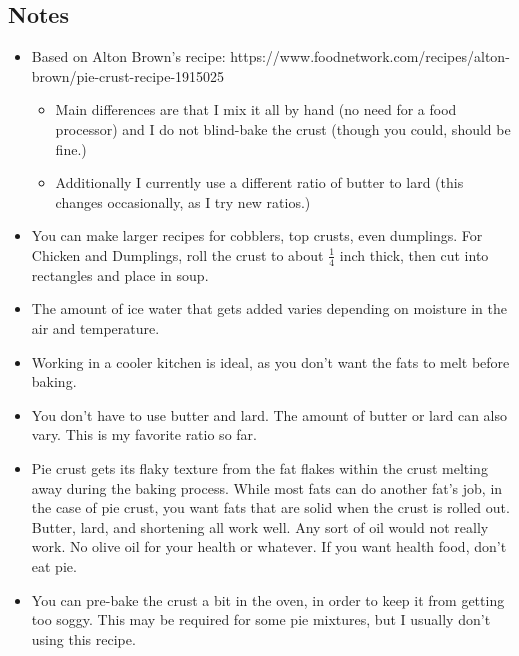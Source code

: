 \begin{multicols}{2}
\begin{enumerate}
\end{enumerate}

\subsection*{Notes}
\begin{itemize}
    \item Based on Alton Brown’s recipe: https://www.foodnetwork.com/recipes/alton-brown/pie-crust-recipe-1915025 
    \begin{itemize}
        \item Main differences are that I mix it all by hand (no need for a food processor) and I do not blind-bake the crust (though you could, should be fine.)
        \item Additionally I currently use a different ratio of butter to lard (this changes occasionally, as I try new ratios.)
    \end{itemize}
    \item You can make larger recipes for cobblers, top crusts, even dumplings. For Chicken and Dumplings, roll the crust to about \( \frac{1}{4} \) inch thick, then cut into rectangles and place in soup.
    \item The amount of ice water that gets added varies depending on moisture in the air and temperature.
    \item Working in a cooler kitchen is ideal, as you don’t want the fats to melt before baking.
    \item You don’t have to use butter and lard. The amount of butter or lard can also vary. This is my favorite ratio so far.
    \item Pie crust gets its flaky texture from the fat flakes within the crust melting away during the baking process. While most fats can do another fat’s job, in the case of pie crust, you want fats that are solid when the crust is rolled out. Butter, lard, and shortening all work well. Any sort of oil would not really work. No olive oil for your health or whatever. If you want health food, don’t eat pie.
    \item You can pre-bake the crust a bit in the oven, in order to keep it from getting too soggy. This may be required for some pie mixtures, but I usually don’t using this recipe.
\end{itemize}
\end{multicols}
\clearpage